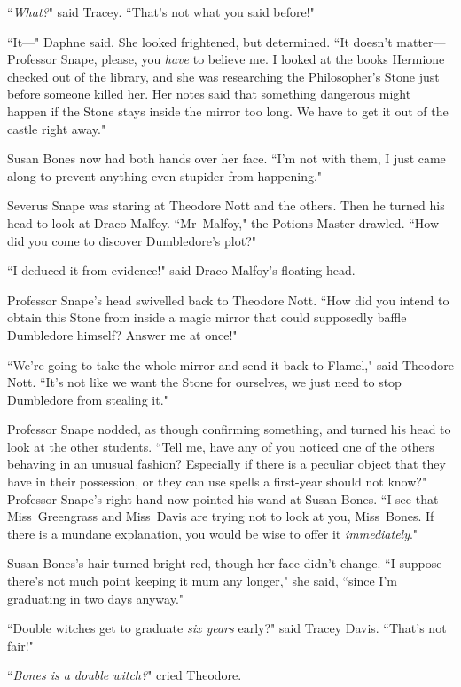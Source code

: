 ``\emph{What?}" said Tracey. ``That's not what you said before!"

``It—" Daphne said. She looked frightened, but determined. ``It doesn't matter—Professor Snape, please, you \emph{have} to believe me. I looked at the books Hermione checked out of the library, and she was researching the Philosopher's Stone just before someone killed her. Her notes said that something dangerous might happen if the Stone stays inside the mirror too long. We have to get it out of the castle right away."

Susan Bones now had both hands over her face. ``I'm not with them, I just came along to prevent anything even stupider from happening."

Severus Snape was staring at Theodore Nott and the others. Then he turned his head to look at Draco Malfoy. ``Mr~Malfoy," the Potions Master drawled. ``How did you come to discover Dumbledore's plot?"

``I deduced it from evidence!" said Draco Malfoy's floating head.

Professor Snape's head swivelled back to Theodore Nott. ``How did you intend to obtain this Stone from inside a magic mirror that could supposedly baffle Dumbledore himself? Answer me at once!"

``We're going to take the whole mirror and send it back to Flamel," said Theodore Nott. ``It's not like we want the Stone for ourselves, we just need to stop Dumbledore from stealing it."

Professor Snape nodded, as though confirming something, and turned his head to look at the other students. ``Tell me, have any of you noticed one of the others behaving in an unusual fashion? Especially if there is a peculiar object that they have in their possession, or they can use spells a first-year should not know?" Professor Snape's right hand now pointed his wand at Susan Bones. ``I see that Miss~Greengrass and Miss~Davis are trying not to look at you, Miss~Bones. If there is a mundane explanation, you would be wise to offer it \emph{immediately}."

Susan Bones's hair turned bright red, though her face didn't change. ``I suppose there's not much point keeping it mum any longer," she said, ``since I'm graduating in two days anyway."

``Double witches get to graduate \emph{six years} early?" said Tracey Davis. ``That's not fair!"

``\emph{Bones is a double witch?}" cried Theodore.

